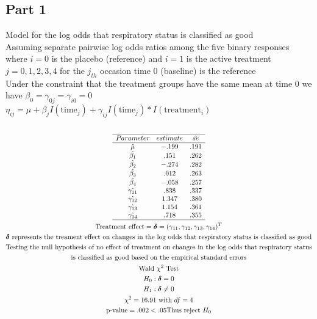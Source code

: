 \documentclass{article}
\begin{document}
\begin{flushleft}
\subsection*{Part 1}
Model for the log odds that respiratory status is classified as good\\
Assuming separate pairwise log odds ratios among the five binary responses\\
where $i=0$ is the placebo (reference) and $i=1$ is the active treatment\\
$j=0,1,2,3,4$ for the $j_{th}$ occasion time 0 (baseline) is the reference \\
Under the constraint that the treatment groups have the same mean at time 0 we have $\beta_0=\gamma_{0j}=\gamma_{i0}=0$\\
$\eta_{ij}=\mu+\beta_jI(\text{time}_j)+\gamma_{ij}I(\text{time}_j)*I(\text{treatment}_i)$\\
\begin{multline*}\\
\begin{array}{ccc}
\hline
Parameter & estimate & \hat{se}\\
\hline
\hat{\mu}& -.199 & .191\\
\hat{\beta_1}& .151 &.262\\
\hat{\beta_2}& -.274 &.282\\
\hat{\beta_3}&.012&.263 \\
\hat{\beta_4}& -.058&.257 \\
\hat{\gamma_{11}}&.838&.337\\
\hat{\gamma_{12}}&1.347& .380\\
\hat{\gamma_{13}}&1.154&.361\\
\hat{\gamma_{14}}&.718&.355\\
\hline
\end{array}\\
\text{Treatment effect}=\boldsymbol{\delta}=(\gamma_{11},\gamma_{12},\gamma_{13},\gamma_{14})^T\\
\boldsymbol{\delta} \text{ represents the treament effect on changes in the log odds that respiratory status is classified as good}\\
\text{Testing the null hypothesis
of no effect of treatment on changes in the log odds that respiratory status}\\ 
\text{is classified as good based on the empirical standard errors}\\
\text{Wald } \chi^2 \text{ Test}\\
H_0: \boldsymbol{\delta}=0\\
H_1: \boldsymbol{\delta}\neq 0\\
\chi^2=16.91 \text{ with } df=4\\
\text{p-value}=.002<.05 \text{Thus reject } H_0\\
\end{multline*}

\end{flushleft}
\end{document}

